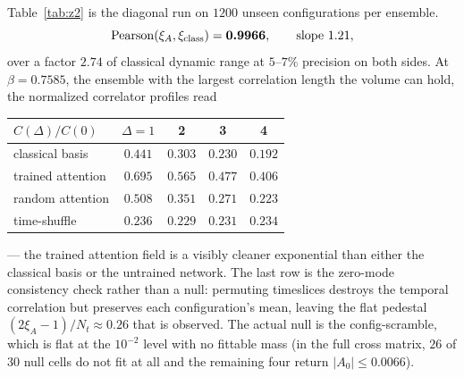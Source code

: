 \documentclass[aps,prl,reprint,superscriptaddress,nofootinbib]{revtex4-2}
\newcommand{\xiA}{\xi_A}
\begin{document}
Table~\ref{tab:z2} is the diagonal run on $1200$ unseen configurations per
ensemble.
\begin{equation}
  \mathrm{Pearson}(\xiA,\xi_{\rm class})=\bm{0.9966},\qquad\text{slope }1.21,
\end{equation}
over a factor $2.74$ of classical dynamic range at $5$--$7\%$ precision on both
sides. At $\beta=0.7585$, the ensemble with the largest correlation length the
volume can hold, the normalized correlator profiles read
\begin{center}\footnotesize
\begin{tabular}{@{}lcccc@{}}
\toprule
$C(\Delta)/C(0)$ & $\Delta=1$ & 2 & 3 & 4\\
\midrule
classical basis & $0.441$ & $0.303$ & $0.230$ & $0.192$\\
trained attention & $\bm{0.695}$ & $\bm{0.565}$ & $\bm{0.477}$ & $\bm{0.406}$\\
random attention & $0.508$ & $0.351$ & $0.271$ & $0.223$\\
time-shuffle & $0.236$ & $0.229$ & $0.231$ & $0.234$\\
\bottomrule
\end{tabular}
\end{center}
--- the trained attention field is a visibly cleaner exponential than either the
classical basis or the untrained network. The last row is the zero-mode
consistency check rather than a null: permuting timeslices destroys the
temporal correlation but preserves each configuration's mean, leaving the flat
pedestal $(2\xiA-1)/N_t\approx0.26$ that is observed. The actual null is the
config-scramble, which is flat at the $10^{-2}$ level with no fittable mass (in
the full cross matrix, $26$ of $30$ null cells do not fit at all and the
remaining four return $|A_0|\le0.0066$).
\end{document}
